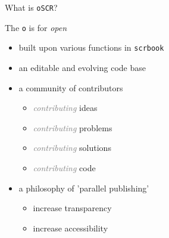 \begin{frame}{What is \texttt{oSCR}?}

The \textcolor{mLightBrown}{\texttt{o}} is for \emph{open}

\begin{itemize}
\item<1->  built upon various functions in \texttt{scrbook}  
\item<2-> an editable and evolving code base
\item<3->  a community of contributors  
  \begin{itemize}
  \item<3-> \textcolor{gray}{\textit{contributing}} ideas
  \item<3-> \textcolor{gray}{\textit{contributing}} problems
  \item<3-> \textcolor{gray}{\textit{contributing}} solutions
  \item<3-> \textcolor{gray}{\textit{contributing}} code
  \end{itemize}
\item<4-> a philosophy of 'parallel publishing' 
  \begin{itemize}
  \item<4-> increase transparency
  \item<4-> increase accessibility
  \end{itemize}
\end{itemize}


\end{frame}

